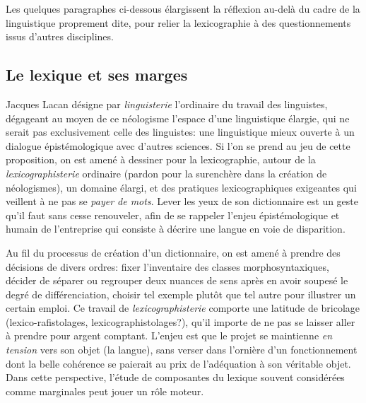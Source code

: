 Les quelques paragraphes ci-dessous élargissent la réflexion au-delà du cadre de la linguistique proprement dite, pour relier la lexicographie à des questionnements issus d'autres disciplines.

\subsection{Le lexique et ses marges}
\label{sec:marges}
Jacques Lacan désigne par \emph{linguisterie} l'ordinaire du travail des linguistes, dégageant au moyen de ce néologisme l'espace d'une linguistique élargie, qui ne serait pas exclusivement celle des linguistes: une linguistique mieux ouverte à un dialogue épistémologique avec d'autres sciences. Si l'on se prend au jeu de cette proposition, on est amené à dessiner pour la lexicographie, autour de la \emph{lexicographisterie} ordinaire (pardon pour la surenchère dans la création de néologismes), un domaine élargi, et des pratiques lexicographiques exigeantes qui veillent à ne pas se \emph{payer de mots}. Lever les yeux de son dictionnaire est un geste qu'il faut sans cesse renouveler, afin de se rappeler l’enjeu épistémologique et humain de l’entreprise qui consiste à décrire une langue en voie de disparition.

Au fil du processus de création d'un dictionnaire, on est amené à prendre des décisions de divers ordres: fixer l'inventaire des classes morphosyntaxiques, décider de séparer ou regrouper deux nuances de sens après en avoir soupesé le degré de différenciation, choisir tel exemple plutôt que tel autre pour illustrer un certain emploi. Ce travail de \emph{lexicographisterie} comporte une latitude de bricolage (lexico-rafistolages, lexicographistolages?), qu'il importe de ne pas se laisser aller à prendre pour argent comptant. L'enjeu est que le projet se maintienne \emph{en tension} vers son objet (la langue), sans verser dans l'ornière d'un fonctionnement dont la belle cohérence se paierait au prix de l'adéquation à son véritable objet. Dans cette perspective, l'étude de composantes du lexique souvent considérées comme marginales peut jouer un rôle moteur.

